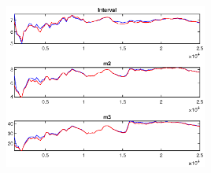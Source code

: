 \documentclass[11pt,preprint, authoryear]{elsarticle}
\let\origfigure\figure
\let\endorigfigure\endfigure
\renewenvironment{figure}[1][2] {
    \expandafter\origfigure\expandafter[H]
} {
    \endorigfigure
}
\numberwithin{equation}{section}
\numberwithin{figure}{section}
\numberwithin{table}{section}
\begin{document}
\begin{figure}
\centering
\includegraphics[width = 0.5\textwidth]{code/MCMC_m_money}
\caption{MCMC multivariate diagnostics of structural parameters for extended sample under the flexible money growth rule (\ref{s2}) [@brooks1998]. The first plot shows the convergence diagnostics for the 80 per cent interval. The second and third plots shows the estimates of the second and third central moments (m2 and m3), respectively. The red line shows the 80 per cent quantile range based on the 25 0000 pooled draws from all sequences and the blue line shows the mean interval range based on the draws of the individual sequences.}
\label{mcmcm3}
\end{figure}
\end{document}
